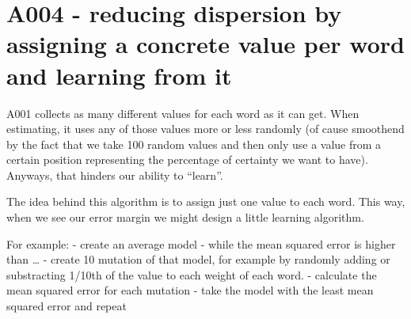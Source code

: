 \newpage{}

\hypertarget{a004---reducing-dispersion-by-assigning-a-concrete-value-per-word-and-learning-from-it}{%
\section{A004 - reducing dispersion by assigning a concrete value per
word and learning from
it}\label{a004---reducing-dispersion-by-assigning-a-concrete-value-per-word-and-learning-from-it}}

A001 collects as many different values for each word as it can get. When
estimating, it uses any of those values more or less randomly (of cause
smoothend by the fact that we take 100 random values and then only use a
value from a certain position representing the percentage of certainty
we want to have). Anyways, that hinders our ability to ``learn''.

The idea behind this algorithm is to assign just one value to each word.
This way, when we see our error margin we might design a little learning
algorithm.

For example: - create an average model - while the mean squared error is
higher than \ldots{} - create 10 mutation of that model, for example by
randomly adding or substracting 1/10th of the value to each weight of
each word. - calculate the mean squared error for each mutation - take
the model with the least mean squared error and repeat
